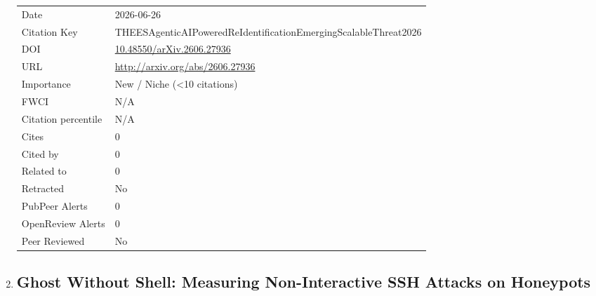 \documentclass{article}
\begin{document}
\begin{enumerate}[label=\arabic*., font=\Large]
\begin{longtable}{p{} p{\contentcolwidth-2\tabcolsep}}
Date & 2026-06-26 \\
Citation Key & THEESAgenticAIPoweredReIdentificationEmergingScalableThreat2026 \\
DOI & \href{http://doi.org/10.48550/arXiv.2606.27936}{10.48550/arXiv.2606.27936} \\
URL & \url{http://arxiv.org/abs/2606.27936} \\
Importance & New / Niche (<10 citations) \\
FWCI & N/A \\
Citation percentile & N/A \\
Cites & 0 \\
Cited by & 0 \\
Related to & 0 \\
Retracted & No \\
PubPeer Alerts & 0 \\
OpenReview Alerts & 0 \\
Peer Reviewed & No \\
\bottomrule
\end{longtable}

\item
{}\label{ghost-without-shell-measuring-non-interactive-ssh-attacks-on-honeypots}
\hypertarget{item_VALEROSGhostShellMeasuringNonInteractiveSSHAttacks2026}{}
\subsection*{Ghost Without Shell: Measuring Non-Interactive SSH Attacks on Honeypots}


\end{enumerate}
\end{document}
